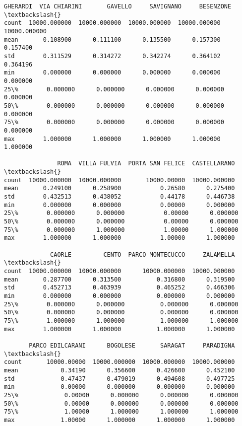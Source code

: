 \documentclass[11pt]{article}
\begin{document}
\begin{tcolorbox}[breakable, size=fbox, boxrule=.5pt, pad at break*=1mm, opacityfill=0]
\begin{Verbatim}[commandchars=\\\{\}]
           GHERARDI  VIA CHIARINI       GAVELLO     SAVIGNANO     BESENZONE  \textbackslash{}
count  10000.000000  10000.000000  10000.000000  10000.000000  10000.000000
mean       0.108900      0.111100      0.135500      0.157300      0.157400
std        0.311529      0.314272      0.342274      0.364102      0.364196
min        0.000000      0.000000      0.000000      0.000000      0.000000
25\%        0.000000      0.000000      0.000000      0.000000      0.000000
50\%        0.000000      0.000000      0.000000      0.000000      0.000000
75\%        0.000000      0.000000      0.000000      0.000000      0.000000
max        1.000000      1.000000      1.000000      1.000000      1.000000

               ROMA  VILLA FULVIA  PORTA SAN FELICE  CASTELLARANO  \textbackslash{}
count  10000.000000  10000.000000       10000.00000  10000.000000
mean       0.249100      0.258900           0.26580      0.275400
std        0.432513      0.438052           0.44178      0.446738
min        0.000000      0.000000           0.00000      0.000000
25\%        0.000000      0.000000           0.00000      0.000000
50\%        0.000000      0.000000           0.00000      0.000000
75\%        0.000000      1.000000           1.00000      1.000000
max        1.000000      1.000000           1.00000      1.000000

             CAORLE         CENTO  PARCO MONTECUCCO     ZALAMELLA  \textbackslash{}
count  10000.000000  10000.000000      10000.000000  10000.000000
mean       0.287700      0.313500          0.316800      0.319500
std        0.452713      0.463939          0.465252      0.466306
min        0.000000      0.000000          0.000000      0.000000
25\%        0.000000      0.000000          0.000000      0.000000
50\%        0.000000      0.000000          0.000000      0.000000
75\%        1.000000      1.000000          1.000000      1.000000
max        1.000000      1.000000          1.000000      1.000000

       PARCO EDILCARANI      BOGOLESE       SARAGAT     PARADIGNA  \textbackslash{}
count       10000.00000  10000.000000  10000.000000  10000.000000
mean            0.34190      0.356600      0.426600      0.452100
std             0.47437      0.479019      0.494608      0.497725
min             0.00000      0.000000      0.000000      0.000000
25\%             0.00000      0.000000      0.000000      0.000000
50\%             0.00000      0.000000      0.000000      0.000000
75\%             1.00000      1.000000      1.000000      1.000000
max             1.00000      1.000000      1.000000      1.000000


\end{Verbatim}
\end{tcolorbox}
\end{document}

